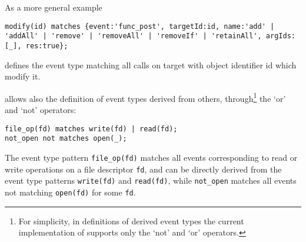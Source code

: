 As a more general example
\begin{lstlisting}[basicstyle=\ttfamily\footnotesize]
modify(id) matches {event:'func_post', targetId:id, name:'add' | 'addAll' | 'remove' | 'removeAll' | 'removeIf' | 'retainAll', argIds:[_], res:true};
\end{lstlisting}
defines the event type matching all calls on target with object identifier id which modify it. 



\rml allows also the definition of event types derived from others, through\footnote{For simplicity, in definitions of derived event types the current implementation of \rml supports only the `not' and `or' operators.} the `or' and `not' operators:
\begin{lstlisting}[basicstyle=\ttfamily\footnotesize]
file_op(fd) matches write(fd) | read(fd);
not_open not matches open(_);
\end{lstlisting}  
The event type pattern \lstinline{file_op(fd)} matches all events corresponding to read or write operations on a file descriptor \lstinline{fd}, and can
be directly derived from the event type patterns \lstinline{write(fd)} and \lstinline{read(fd)}, while \lstinline{not_open} matches all
events not matching \lstinline{open(fd)} for some \lstinline{fd}.

